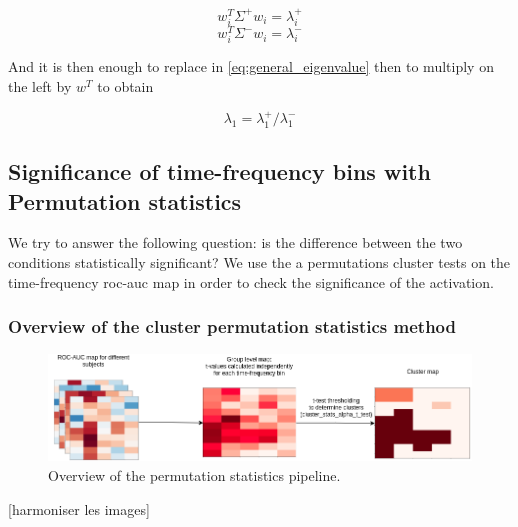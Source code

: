 \begin{equation}
    w^{T}_{i} \Sigma^{+} w_{i} = \lambda^{+}_{i}
    \label{eq:lambda_plus_first_component}
\end{equation}
\begin{equation}
    w^{T}_{i} \Sigma^{-} w_{i} = \lambda^{-}_{i}
    \label{eq:lambda_minus_first_component}
\end{equation}

And it is then enough to replace in \ref{eq:general_eigenvalue} then to multiply on the left by $w^{T}$ to obtain


\begin{equation}
    \lambda_1 = \lambda^{+}_1 / \lambda^{-}_1
\end{equation}


\subsection{Significance of time-frequency bins with Permutation statistics}

We try to answer the following question: is the difference between
the two conditions statistically significant? We use the a permutations
cluster tests on the time-frequency roc-auc map in order to check the significance of the activation.

\subsubsection{Overview of the cluster permutation statistics method}

\begin{figure}[ht]
    \centering
    \includegraphics[width=15cm]{images_report/sensor/Permutation_statistics.png}
    \caption[Overview of the permutation statistics pipeline.]%
    {Overview of the permutation statistics pipeline.}
    \label{permutation_statistics_pipeline}
\end{figure}
[harmoniser les images]


